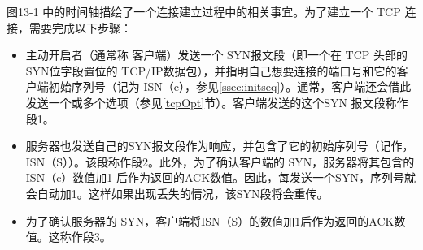 图13-1 中的时间轴描绘了一个连接建立过程中的相关事宜。为了建立一个 TCP 连接，需要完成以下步骤：
\begin{itemize}
  \item 主动开启者（通常称 客户端）发送一个 SYN报文段（即一个在 TCP 头部的SYN位字段置位的
    TCP/IP数据包），并指明自己想要连接的端口号和它的客户端初始序列号（记为
    ISN（c），参见\ref{ssec:initseq}）。通常，客户端还会借此发送一个或多个选项（参见\ref{tcpOpt}节）。客户端发送的这个SYN
    报文段称作段1。
  \item 服务器也发送自己的SYN报文段作为响应，并包含了它的初始序列号（记作，ISN（S））。该段称作段2。此外，为了确认客户端的
    SYN，服务器将其包含的ISN（c）数值加1
    后作为返回的ACK数值。因此，每发送一个SYN，序列号就会自动加1。这样如果出现丢失的情况，该SYN段将会重传。
  \item 为了确认服务器的 SYN，客户端将ISN（S）的数值加1后作为返回的ACK数值。这称作段3。
\end{itemize}
